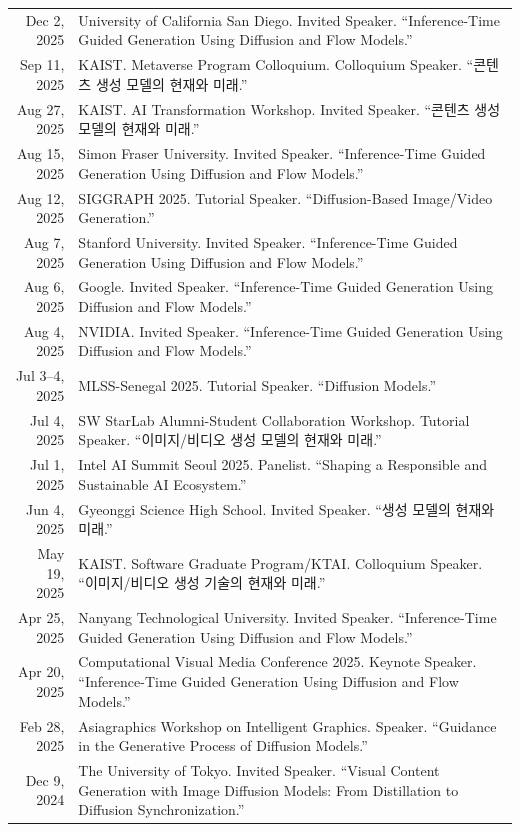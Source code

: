 \documentclass[letterpaper,10pt]{article} %
\begin{document}
\begin{xltabular}{\textwidth}{r|X}
Dec 2, 2025 & University of California San Diego. Invited Speaker. ``Inference-Time Guided Generation Using Diffusion and Flow Models.''\\
Sep 11, 2025 & KAIST. Metaverse Program Colloquium. Colloquium Speaker. ``콘텐츠 생성 모델의 현재와 미래.''\\
Aug 27, 2025 & KAIST. AI Transformation Workshop. Invited Speaker. ``콘텐츠 생성 모델의 현재와 미래.''\\
Aug 15, 2025 & Simon Fraser University. Invited Speaker. ``Inference-Time Guided Generation Using Diffusion and Flow Models.''\\
Aug 12, 2025 & SIGGRAPH 2025. Tutorial Speaker. ``Diffusion-Based Image/Video Generation.''\\
Aug 7, 2025 & Stanford University. Invited Speaker. ``Inference-Time Guided Generation Using Diffusion and Flow Models.''\\
Aug 6, 2025 & Google. Invited Speaker. ``Inference-Time Guided Generation Using Diffusion and Flow Models.''\\
Aug 4, 2025 & NVIDIA. Invited Speaker. ``Inference-Time Guided Generation Using Diffusion and Flow Models.''\\
Jul 3--4, 2025 & MLSS-Senegal 2025. Tutorial Speaker. ``Diffusion Models.''\\
Jul 4, 2025 & SW StarLab Alumni-Student Collaboration Workshop. Tutorial Speaker. ``이미지/비디오 생성 모델의 현재와 미래.''\\
Jul 1, 2025 & Intel AI Summit Seoul 2025. Panelist. ``Shaping a Responsible and Sustainable AI Ecosystem.''\\
Jun 4, 2025 & Gyeonggi Science High School. Invited Speaker. ``생성 모델의 현재와 미래.''\\
May 19, 2025 & KAIST. Software Graduate Program/KTAI. Colloquium Speaker. ``이미지/비디오 생성 기술의 현재와 미래.''\\
Apr 25, 2025 & Nanyang Technological University. Invited Speaker. ``Inference-Time Guided Generation Using Diffusion and Flow Models.''\\
Apr 20, 2025 & Computational Visual Media Conference 2025. Keynote Speaker. ``Inference-Time Guided Generation Using Diffusion and Flow Models.''\\
Feb 28, 2025 & Asiagraphics Workshop on Intelligent Graphics. Speaker. ``Guidance in the Generative Process of Diffusion Models.''\\
Dec 9, 2024 & The University of Tokyo. Invited Speaker. ``Visual Content Generation with Image Diffusion Models: From Distillation to Diffusion Synchronization.''\\

\end{xltabular}
\end{document}
